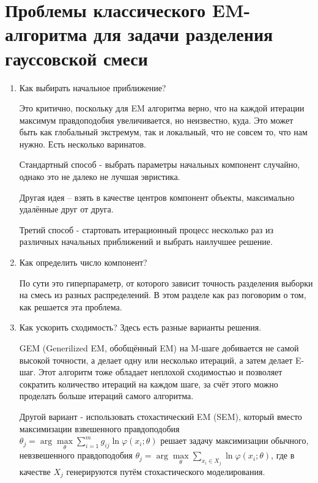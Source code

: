 \newpage

\section*{\textbf{Проблемы классического EM-алгоритма для задачи разделения гауссовской смеси}}
\begin{enumerate}
\item Как выбирать начальное приближение?

    Это критично, поскольку для EM алгоритма верно, что на каждой итерации максимум правдоподобия увеличивается, но неизвестно, куда. Это может быть как глобальный экстремум, так и локальный, что не совсем то, что нам нужно. Есть несколько варинатов.

    Стандартный способ - выбрать параметры начальных компонент случайно, однако это не далеко не лучшая эвристика.

    Другая идея -- взять в качестве центров компонент объекты, максимально удалённые друг от друга.

    Третий способ - стартовать итерационный процесс несколько раз из различных начальных приближений и выбрать наилучшее решение.

\item Как определить число компонент?

   По сути это гиперпараметр, от которого зависит точность разделения выборки на смесь из разных распределений. В этом разделе как раз поговорим о том, как решается эта проблема.

\item Как ускорить сходимость? Здесь есть разные варианты решения.

    GEM (Generilized EM, обобщённый EM) на M-шаге добивается не самой высокой точности, а делает одну или несколько итераций, а затем делает E-шаг. Этот алгоритм тоже обладает неплохой сходимостью и позволяет сократить количество итераций на каждом шаге, за счёт этого можно проделать больше итераций самого алгоритма.

    Другой вариант - использовать стохастический EM (SEM), который вместо максимизации взвешенного правдоподобия $\theta_j = \arg\max\limits_{\theta}\sum\limits_{i=1}^m g_{ij}\ln\varphi(x_i; \theta)$ решает задачу максимизации обычного, невзвешенного правдоподобия $\theta_j = \arg\max\limits_{\theta}\sum\limits_{x_i \in X_j} \ln\varphi(x_i; \theta)$, где в качестве $X_j$ генерируются путём стохастического моделирования.

\end{enumerate}

